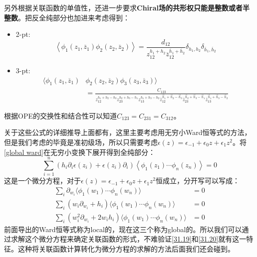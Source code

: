 另外根据关联函数的单值性，还进一步要求\textbf{Chiral场的共形权只能是整数或者半整数}。把反全纯部分也加进来考虑得到：
\begin{itemize}
	\item 2-pt:
	\begin{equation}
		\left\langle\phi_1(z_1,\overline{z}_1)\phi_2(z_2,\overline{z}_2)\right\rangle=\frac{d_{12}}{z_{12}^{h_1+h_2}\overline{z}_{12}^{\overline{h}_1+\overline{h}_2}}\delta_{h_1,h_2}\delta_{\overline{h}_1,\overline{h}_2}
	\end{equation}
	\item 3-pt:
	\begin{equation}
		\begin{aligned}\big\langle\phi_1(z_1,\overline{z}_1)&\phi_2(z_2,\overline{z}_2)\phi_3(z_3,\overline{z}_3)\big\rangle\\&=\frac{C_{123}}{z_{12}^{h_1+h_2-h_3}z_{23}^{h_2+h_3-h_1}z_{13}^{h_1+h_3-h_2}\overline{z}_{12}^{\vec{h}_1+\vec{h}_2-\vec{h}_3}\overline{z}_{23}^{\vec{h}_2+\vec{h}_3-\vec{h}_1}\overline{z}_{13}^{\vec{h}_1+\vec{h}_3-\vec{h}_2} }\end{aligned}
	\end{equation}
\end{itemize}
根据OPE的交换性和结合性可以知道$C_{123}=C_{231}=C_{312}$。

关于这些公式的详细推导\cite{ito}上面都有，这里主要考虑用无穷小Ward恒等式的方法，但是我们考虑的毕竟是准初级场，所以只需要考虑$\epsilon(z)=\epsilon_{-1}+\epsilon_0z+\epsilon_1z^2$。将\ref{global ward}在无穷小变换下展开得到全纯部分：
\begin{equation}
	\boxed{
		\displaystyle\sum_{i=1}^{n}\left(h_{i}\partial_{i}\epsilon\left(z_{i}\right)+\epsilon\left(z_{i}\right)\partial_{i}\right)\left<\phi_{1}\left(z_{1}\right)\cdots\phi_{n}\left(z_{n}\right)\right>=0
	}
\end{equation}
这是一个微分方程，对于$\epsilon(z)=\epsilon_{-1}+\epsilon_0z+\epsilon_1z^2$恒成立，分开写可以写成：
\begin{equation}\label{31.37}
	\begin{aligned}\sum_i\partial_{w_i}\langle\phi_1(w_1)\cdots\phi_n(w_n)\rangle&=0\\\sum_i(w_i\partial_{w_i}+h_i)\langle\phi_1(w_1)\cdots\phi_n(w_n)\rangle&=0\\\sum_i(w_i^2\partial_{w_i}+2w_ih_i)\langle\phi_1(w_1)\cdots\phi_n(w_n)\rangle&=0\end{aligned}
\end{equation}
前面导出的Ward恒等式称为local的，现在这三个称为global的。所以我们可以通过求解这个微分方程来确定关联函数的形式，不难验证\ref{31.19}和\ref{31.20}就有这一特征。这种将关联函数计算转化为微分方程的求解的方法后面我们还会碰到。


